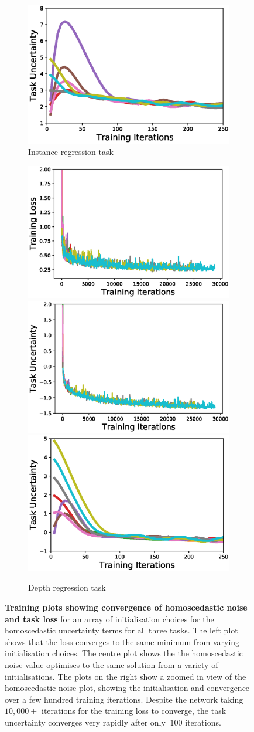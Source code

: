 \begin{figure}[p]
\begin{subfigure}[t]{\linewidth}
\begin{center}
  \includegraphics[width=0.32\linewidth]{plots/instance_weight_zoom.eps}
  \caption{Instance regression task}
\end{center}
\end{subfigure}
\begin{subfigure}[t]{\linewidth}
\begin{center}
  \includegraphics[width=0.32\linewidth]{plots/depth_loss.eps}
  \includegraphics[width=0.32\linewidth]{plots/depth_weight.eps}
  \includegraphics[width=0.32\linewidth]{plots/depth_weight_zoom.eps}
  \caption{Depth regression task}
\end{center}
\end{subfigure}
   \caption[Convergence of task weights during training.]{\textbf{Training plots showing convergence of homoscedastic noise and task loss} for an array of initialisation choices for the homoscedastic uncertainty terms for all three tasks. The left plot shows that the loss converges to the same minimum from varying initialisation choices. The centre plot shows the the homoscedastic noise value optimises to the same solution from a variety of initialisations. The plots on the right show a zoomed in view of the homoscedastic noise plot, showing the initialisation and convergence over a few hundred training iterations. Despite the network taking $10,000+$ iterations for the training loss to converge, the task uncertainty converges very rapidly after only $~100$ iterations.}
\label{fig:convergence}
\end{figure}


